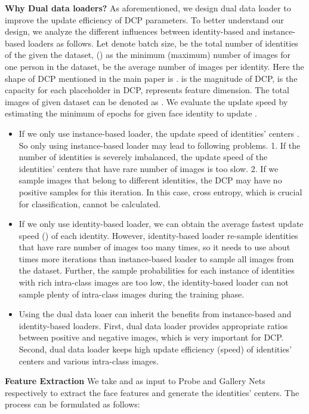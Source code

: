 \textbf{Why Dual data loaders?}
As aforementioned, we design dual data loader to improve the update efficiency of DCP parameters.
To better understand our design, we analyze the different influences between identity-based and instance-based loaders as follows.
Let  denote batch size,  be the total number of identities of the given the dataset,  () as the minimum (maximum) number of images for one person in the dataset,  be the average number of images per identity.
Here the shape of DCP mentioned in the main paper is .
 is the magnitude of DCP,  is the capacity for each placeholder in DCP,  represents feature dimension.
The total images of given dataset can be denoted as .
We evaluate the update speed by estimating the minimum of epochs for  given face identity to update .
\begin{itemize}
\item If we only use instance-based loader, the update speed of identities' centers . So only using instance-based loader may lead to following problems.
1. If the number of identities is severely imbalanced, the update speed of the identities' centers that have rare number of images is too slow.
2. If we sample  images that belong to  different identities, the DCP may have no positive samples for this iteration.
In this case, cross entropy, which is crucial for classification, cannot be calculated.

\item If we only use identity-based loader, we can obtain the average fastest update speed () of each identity.
However, identity-based loader re-sample identities that have rare number of images too many times, so it needs to use about  times more iterations than instance-based loader to sample all images from the dataset.
Further, the sample probabilities for each instance of identities with rich intra-class images are too low, the identity-based loader can not sample plenty of intra-class images during the training phase.

\item Using the dual data loaer can inherit the benefits from instance-based and identity-based loaders.
First, dual data loader provides appropriate ratios between positive and negative images, which is very important for DCP.
Second, dual data loader keeps high update efficiency (speed) of identities' centers and various intra-class images.
\end{itemize}



\textbf{Feature Extraction} We take  and  as input to Probe and Gallery Nets respectively to extract the face features and generate the identities' centers.
The process can be formulated as follows:

